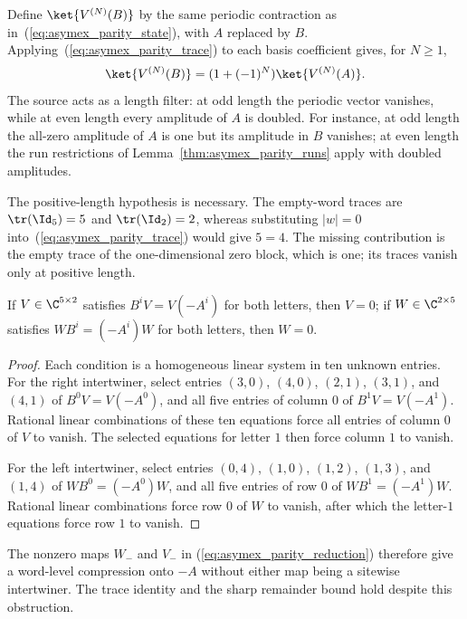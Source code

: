 Define $\ket{V^{(N)}(B)}$ by the same periodic contraction as
in~(\ref{eq:asymex_parity_state}), with $A$ replaced by $B$.
Applying~(\ref{eq:asymex_parity_trace}) to each basis coefficient
gives, for $N\geq1$,
\begin{align}
    \ket{V^{(N)}(B)}
    =(1+(-1)^N)\ket{V^{(N)}(A)}.
    \label{eq:asymex_parity_length}
\end{align}
The source acts as a length filter: at odd length the periodic vector
vanishes, while at even length every amplitude of $A$ is doubled.
For instance, at odd length the all-zero amplitude of $A$ is one but its
amplitude in $B$ vanishes; at even length the run restrictions of
Lemma~\ref{thm:asymex_parity_runs} apply with doubled amplitudes.

The positive-length hypothesis is necessary. The empty-word
traces are $\tr(\Id_5)=5$ and $\tr(\Id_2)=2$, whereas substituting
$|w|=0$ into~(\ref{eq:asymex_parity_trace}) would give $5=4$.
The missing contribution is the empty trace of the
one-dimensional zero block, which is one; its traces vanish only
at positive length.

\begin{lemma}
    \label{thm:asymex_parity_no_intertwiner}
    \leanok
    If $V\in\C^{5\times2}$ satisfies $B^iV=V(-A^i)$ for both letters, then
    $V=0$; if $W\in\C^{2\times5}$ satisfies $WB^i=(-A^i)W$ for both
    letters, then $W=0$.
\end{lemma}

\begin{proof}
    \leanok
    Each condition is a homogeneous linear system in ten unknown
    entries. For the right intertwiner, select entries
    $(3,0)$, $(4,0)$, $(2,1)$, $(3,1)$, and $(4,1)$ of
    $B^0V=V(-A^0)$, and all five entries of column $0$ of
    $B^1V=V(-A^1)$. Rational linear combinations of these ten
    equations force all entries of column $0$ of $V$ to vanish.
    The selected equations for letter $1$ then force column $1$
    to vanish.

    For the left intertwiner, select entries $(0,4)$, $(1,0)$,
    $(1,2)$, $(1,3)$, and $(1,4)$ of $WB^0=(-A^0)W$, and all
    five entries of row $0$ of $WB^1=(-A^1)W$. Rational linear
    combinations force row $0$ of $W$ to vanish, after which the
    letter-$1$ equations force row $1$ to vanish.
\end{proof}

The nonzero maps $W_-$ and $V_-$ in
(\ref{eq:asymex_parity_reduction}) therefore give a word-level
compression onto $-A$ without either map being a sitewise
intertwiner. The trace identity and the sharp remainder bound
hold despite this obstruction.
